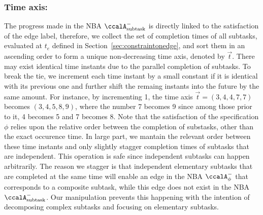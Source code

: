 \documentclass[Afour,sageh,times]{sagej}
\newcommand{\auto}[1]{\ccalA_{\textup{#1}}}
\newcommand{\autop}{\ccalA_{\phi}}
\begin{document}
{{  \subsubsection{Time axis:} The progress made in the NBA $\auto{subtask}^-$ is directly linked to the satisfaction of the edge label, therefore, we collect the  set of completion times of all subtasks, evaluated at $t_e$ defined in Section~\ref{sec:constraintonedge}, and sort them in an ascending order to form a unique non-decreasing time axis, denoted by $\vec{t}$. There may exist identical time instants due to the parallel completion of subtasks. To break the tie, we increment each time instant by a small constant if it is identical with its previous one and further shift the remaing instants into the future by the same amount. For instance, by incrementing 1, the time axis $\vec{t}= (3, 4, 4, 7, 7)$ becomes $(3, 4, 5, 8, 9)$, where the number 7 becomes 9 since among those prior to it, 4 becomes 5 and 7 becomes 8.  Note that the satisfaction of  the specification $\phi$ relies upon the relative order between the completion of substasks, other than the exact occurence time. In large part, we mantain the relevant order between these time instants and only slightly stagger completion times of subtasks that are independent. This operation is safe since independent subtasks can happen arbitrarily. The reason we stagger is that independent elementary subtasks that are completed at the same time will enable an edge in the NBA $\autop^-$ that corresponds to a composite subtask, while this edge does not exist in the NBA $\auto{subtask}^-$. Our manipulation prevents this happening with the intention of decomposing complex subtasks and focusing on elementary subtasks.

}}
\end{document}
